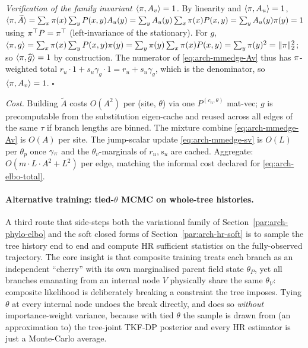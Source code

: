 \emph{Verification of the family invariant $\langle \pi, A_v \rangle
= 1$.} By linearity and $\langle \pi, A_u \rangle = 1$,
$\langle \pi, \widetilde A \rangle
    = \sum_x \pi(x) \sum_y P(x, y) A_u(y)
    = \sum_y A_u(y) \sum_x \pi(x) P(x, y)
    = \sum_y A_u(y) \pi(y) = 1$
using $\pi^\top P = \pi^\top$ (left-invariance of the stationary).
For $g$, $\langle \pi, g \rangle
    = \sum_x \pi(x) \sum_y P(x, y) \pi(y)
    = \sum_y \pi(y) \sum_x \pi(x) P(x, y)
    = \sum_y \pi(y)^2 = \|\pi\|_2^2$; so
$\langle \pi, \widehat g \rangle = 1$ by construction. The numerator
of \eqref{eq:arch-mmedge-Av} thus has $\pi$-weighted total
$r_u \cdot 1 + s_u \gamma_g \cdot 1 = r_u + s_u \gamma_g$, which is the
denominator, so $\langle \pi, A_v \rangle = 1$. $\square$

\emph{Cost.} Building $\widetilde A$ costs $O(A^2)$ per (site,
$\theta$) via one $P^{(c_n, \theta)}$ mat-vec; $g$ is precomputable
from the substitution eigen-cache and reused across all edges of the
same $\tau$ if branch lengths are binned. The mixture combine
\eqref{eq:arch-mmedge-Av} is $O(A)$ per site. The jump-scalar update
\eqref{eq:arch-mmedge-sv} is $O(L)$ per $\theta_p$ once $\gamma_\pi$
and the $\theta_v$-marginals of $r_u, s_u$ are cached. Aggregate:
$O(m \cdot L \cdot A^2 + L^2)$ per edge, matching the informal cost
declared for \eqref{eq:arch-elbo-total}.

\fi

\paragraph{Alternative training: tied-$\theta$ MCMC on whole-tree
histories.}
\label{par:arch-lg08-is}
A third route that side-steps both the variational family of
Section~\ref{par:arch-phylo-elbo} and the soft closed forms of
Section~\ref{par:arch-hr-soft} is to sample the tree history end to
end and compute HR sufficient statistics on the fully-observed
trajectory. The core insight is that composite training treats each
branch as an independent ``cherry'' with its own marginalised parent
field state $\theta_P$, yet all branches emanating from an internal
node $V$ physically share the same $\theta_V$: composite likelihood
is deliberately breaking a constraint the tree imposes. Tying
$\theta$ at every internal node undoes the break directly, and does
so \emph{without} importance-weight variance, because with tied $\theta$
the sample is drawn from (an approximation to) the tree-joint TKF-DP
posterior and every HR estimator is just a Monte-Carlo average.

